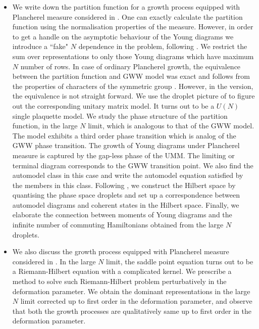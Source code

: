 \documentclass[3p,12pt]{elsarticle}
\numberwithin{equation}{section}
\begin{document}
\begin{itemize}
    
    \item We write down the partition function for a growth process equipped with \qd Plancherel measure considered in \cite{Caporaso:2006gk, Nekrasov:2003rj, Nekrasov:2002qd, Marino:2006hs,Eynard:2008mt}. One can exactly calculate the partition function using the normalisation properties of the measure. However, in order to get a handle on the asymptotic behaviour of the Young diagrams we introduce a ``fake" $N$ dependence in the problem, following \cite{Chattopadhyay:2019pkl}. We restrict the sum over representations to only those Young diagrams which have maximum $N$ number of rows. In case of ordinary Plancherel growth, the equivalence between the partition function and GWW model was exact and follows from the properties of characters of the symmetric group \cite{Chattopadhyay:2019pkl}. However, in the \qd version, the equivalence is not straight forward. We use the droplet picture of \cite{duttagopakumar, Chattopadhyay} to figure out the corresponding unitary matrix model. It turns out to be a $U(N)$ single plaquette model. We study the phase structure of the \qd partition function, in the large $N$ limit, which is analogous to that of the GWW model. The model exhibits a third order phase transition which is \qq analog of the GWW phase transition. The growth of Young diagrams under \qd Plancherel measure is captured by the gap-less phase of the UMM. The limiting or terminal diagram corresponds to the \qd GWW transition point. We also find the automodel class in this case and write the automodel equation satisfied by the members in this class. Following \cite{Chattopadhyay:2019pkl,Chattopadhyay:2020rle}, we construct the Hilbert space by quantising the phase space droplets and set up a correspondence between \qd automodel diagrams and coherent states in the Hilbert space. Finally, we elaborate the connection between moments of Young diagrams and the infinite number of commuting Hamiltonians obtained from the large $N$ droplets.
    
    \item We also discuss the growth process equipped with \qd Plancherel measure considered in \cite{Strahov07}.  In the large $N$ limit, the saddle point equation turns out to be a Riemann-Hilbert equation with a complicated kernel. We prescribe a method to solve such Riemann-Hilbert problem perturbatively in the deformation parameter. We obtain the dominant representations in the large $N$ limit corrected up to first order in the deformation parameter,
    and observe that both the growth processes are qualitatively same up to first order in the deformation parameter.
    
\end{itemize}
\end{document}

